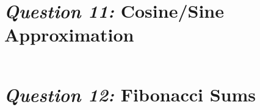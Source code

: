 \documentclass[12pt]{article}
\begin{document}
\section{\textit{Question 11:} Cosine/Sine Approximation}





\begin{lstlisting}[caption={Screen dump for \textit{Question
11}},language=Python]
\end{lstlisting}

\section{\textit{Question 12:} Fibonacci Sums}





\begin{lstlisting}[caption={Screen dump for \textit{Question
12}},language=Python]
\end{lstlisting}
\end{document}
